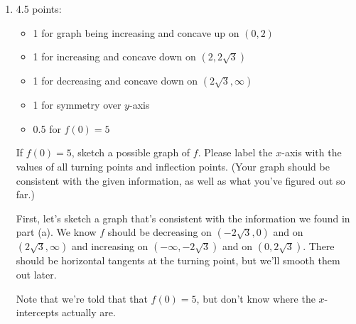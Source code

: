\documentclass{article}
\begin{document}
\begin{enumerate}
\begin{enumerate}
  \item \label{sketch-from-cubic-derivative-1-possibility-1}

    \begin{grading}
      4.5 points:
      \begin{itemize}[nosep]
      \item 1 for graph being increasing and concave up on $(0, 2)$
      \item 1 for increasing and concave down on $(2, 2 \sqrt{3})$
      \item 1 for decreasing and concave down on $(2 \sqrt{3}, \infty)$
      \item 1 for symmetry over $y$-axis
      \item 0.5 for $f(0) = 5$
      \end{itemize}
    \end{grading}

    \begin{problem}[\stretch{2}]
      If $f(0) = 5$, sketch a possible graph of $f$. Please label the $x$-axis with the values of all turning points and inflection points. (Your graph should be consistent with the given information, as well as what you've figured out so far.) 
    \end{problem}

    \begin{solution}
      First, let's sketch a graph that's consistent with the information we found in part (a). We know
      $f$ should be decreasing on $(-2\sqrt{3}, 0)$ and on $(2\sqrt{3}, \infty)$
      and increasing on $(-\infty, -2\sqrt{3})$ and on $(0, 2\sqrt{3})$. 
      There should be horizontal tangents at the turning point, but we'll smooth them out later.

      \begin{center}
      \end{center}

     Note that we're told that that $f(0)=5$, but don't know where the $x$-intercepts actually are.


\end{solution}
\end{enumerate}
\end{enumerate}
\end{document}

